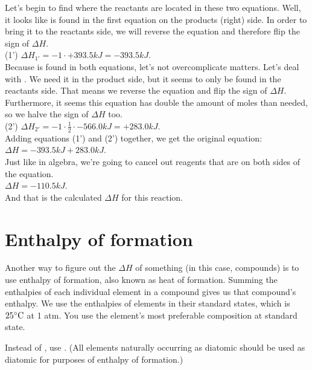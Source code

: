 \documentclass[letterpaper, 12pt]{article}
\begin{document}
Let's begin to find where the reactants are located in these two equations. Well, it looks like  is found in the first equation on the products (right) side. In order to bring it to the reactants side, we will reverse the equation and therefore flip the sign of $\Delta H$.\\

(1')  $\Delta H_{1'} = -1 \cdot +393.5 kJ = -393.5 kJ$.\\

Because  is found in both equations, let's not overcomplicate matters. Let's deal with . We need it in the product side, but it seems to only be found in the reactants side. That means we reverse the equation and flip the sign of $\Delta H$. Furthermore, it seems this equation has double the amount of moles than needed, so we halve the sign of $\Delta H$ too.\\

(2')  $\Delta H_{2'} = -1 \cdot \frac{1}{2} \cdot -566.0kJ = +283.0 kJ$.\\

Adding equations (1') and (2') together, we get the original equation:\\

 $\Delta H = -393.5 kJ + 283.0 kJ$.\\

Just like in algebra, we're going to cancel out reagents that are on both sides of the equation.\\

 $\Delta H = -110.5 kJ$.\\

And that is the calculated $\Delta H$ for this reaction.

\section{Enthalpy of formation}
Another way to figure out the $\Delta H$ of something (in this case, compounds) is to use enthalpy of formation, also known as heat of formation. Summing the enthalpies of each individual element in a compound gives us that compound's enthalpy. We use the enthalpies of elements in their standard states, which is $25^{\circ}{\rm C}$ at 1 atm. You use the element's most preferable composition at standard state.

Instead of , use . (All elements naturally occurring as diatomic should be used as diatomic for purposes of enthalpy of formation.)
\end{document}
